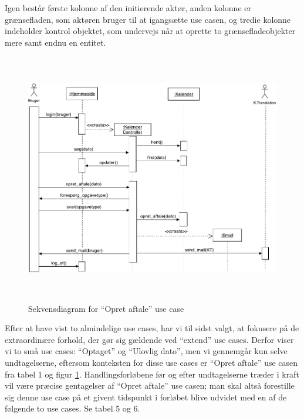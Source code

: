 \documentclass[12pt]{article}   %
\begin{document}
Igen består første kolonne af den initierende aktør, anden kolonne er
grænsefladen, som aktøren bruger til at igangsætte use casen, og tredie
kolonne indeholder kontrol objektet, som undervejs når at oprette to
grænsefladeobjekter mere samt endnu en entitet.

\begin{figure}[!ht]
\includegraphics[width=14cm, height=11cm]{seq.pdf}
\caption{Sekvensdiagram for ``Opret aftale'' use case}
\label{fig:aft}
\end{figure}

Efter at have vist to almindelige use cases, har vi til sidst valgt, 
at fokusere på de extraordinære forhold, der gør sig gældende ved ``extend''
use cases. Derfor viser vi to små use cases: ``Optaget'' og ``Ulovlig
dato'', men vi gennemgår kun selve undtagelserne, eftersom konteksten for
disse use cases er ``Opret aftale'' use casen fra tabel
1 og figur \ref{fig:aft}. Handlingsforløbene før og efter undtagelserne træder i
kraft vil være præcise gentagelser af ``Opret aftale'' use casen; man skal
altså forestille sig denne use case på et givent tidspunkt i forløbet
blive udvidet med en af de følgende to use cases. Se tabel 5 og 6. 
\end{document}
